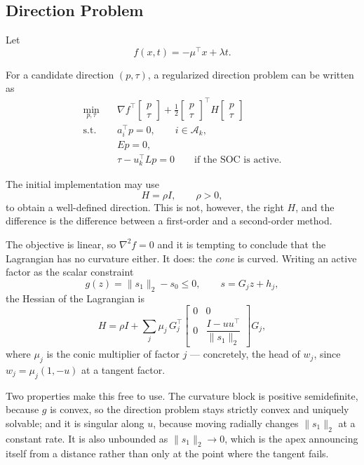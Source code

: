 \documentclass[11pt,a4paper]{article}
\begin{document}
\subsection{Direction Problem}

Let
\[
f(x,t)=-\mu^\top x+\lambda t.
\]

For a candidate direction $(p,\tau)$, a regularized direction problem
can be written as
\begin{equation}
\begin{aligned}
\min_{p,\tau}\quad&
\nabla f^\top
\begin{bmatrix}
p\\
\tau
\end{bmatrix}
+
\frac12
\begin{bmatrix}
p\\
\tau
\end{bmatrix}^{\!\top}
H
\begin{bmatrix}
p\\
\tau
\end{bmatrix}\\
\text{s.t.}\quad&
a_i^\top p=0,
\qquad i\in\mathcal A_k,\\
&Ep=0,\\
&\tau-u_k^\top Lp=0
\qquad\text{if the SOC is active.}
\end{aligned}
\tag{4}
\end{equation}

The initial implementation may use
\[
H=\rho I,
\qquad \rho>0,
\]
to obtain a well-defined direction. This is not, however, the right
$H$, and the difference is the difference between a first-order and a
second-order method.

The objective is linear, so $\nabla^2f=0$ and it is tempting to
conclude that the Lagrangian has no curvature either. It does: the
\emph{cone} is curved. Writing an active factor as the scalar
constraint
\[
g(z)=\|s_1\|_2-s_0\leq0,
\qquad
s=G_jz+h_j,
\]
the Hessian of the Lagrangian is
\begin{equation}
H
=
\rho I
+
\sum_j\mu_j\,G_j^\top
\begin{bmatrix}
0&0\\
0&\dfrac{I-u u^\top}{\|s_1\|_2}
\end{bmatrix}
G_j,
\tag{4b}
\end{equation}
where $\mu_j$ is the conic multiplier of factor $j$ --- concretely,
the head of $w_j$, since $w_j=\mu_j(1,-u)$ at a tangent factor.

Two properties make this free to use. The curvature block is positive
semidefinite, because $g$ is convex, so the direction problem stays
strictly convex and uniquely solvable; and it is singular along $u$,
because moving radially changes $\|s_1\|_2$ at a constant rate. It is
also unbounded as $\|s_1\|_2\to0$, which is the apex announcing itself
from a distance rather than only at the point where the tangent fails.
\end{document}
